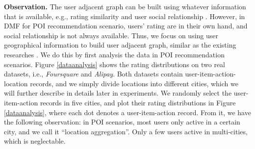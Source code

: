 \textbf{Observation.} 
The user adjacent graph can be built using whatever information that is available, e.g., rating similarity \cite{su2009survey} and user social relationship \cite{yang2011like}. 
However, in DMF for POI recommendation scenario, users' rating are in their own hand, and social relationship is not always available. 
Thus, we focus on using user geographical information to build user adjacent graph, similar as the existing researches \cite{ye2011exploiting,cho2011friendship,cheng2012fused}. 
We do this by first analysis the data in POI recommendation scenarios. 
Figure \ref{dataanalysis} shows the rating distributions on two real datasets, i.e., \emph{Foursquare} and \emph{Alipay}. 
Both datasets contain user-item-action-location records, and we simply divide locations into different cities, which we will further describe in details later in experiments. 
We randomly select the user-item-action records in five cities, and plot their rating distributions in Figure \ref{dataanalysis}, where each dot denotes a user-item-action record. 
From it, we have the following observation: 
in POI scenarios, most users only active in a certain city, and we call it ``location aggregation''. 
Only a few users active in multi-cities, which is neglectable. 


